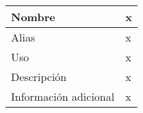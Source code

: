 \begin{center}
  \begin{tabular}{| l | l |}
    \hline
    Nombre & x\\
    \hline
    Alias & x\\
    \hline
    Uso & x\\
    \hline
    Descripción & x\\
    \hline
    Información adicional & x\\
    \hline
  \end{tabular}
\end{center}

